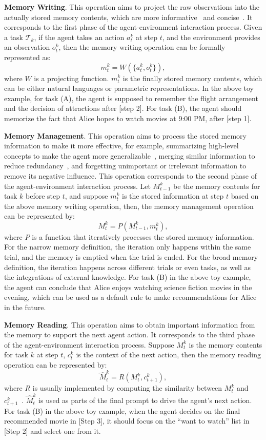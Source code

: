 \documentclass{article}
\theoremstyle{definition}
\theoremstyle{theorem}
\theoremstyle{proof}
\theoremstyle{remark}
\begin{document}
	\textbf{Memory Writing}. 
	This operation aims to project the raw observations into the actually stored memory contents, which are more informative~\cite{ret_llm} and concise~\cite{memorybank}.
	It corresponds to the first phase of the agent-environment interaction process.
	Given a task $\mathcal{T}_k$, if the agent takes an action $a^k_t$ at step $t$, and the environment provides an observation $o^k_t$, then the memory writing operation can be formally represented as:
	$$m_{t}^k = W(\{a^k_t, o^k_t\}),$$
	where $W$ is a projecting function. 
	$m_t^k$ is the finally stored memory contents, which can be either natural languages or parametric representations.    
	In the above toy example, for task (A), the agent is supposed to remember the flight arrangement and the decision of attractions after [step 2].
	For task (B), the agent should memorize the fact that Alice hopes to watch movies at 9:00 PM, after [step 1].
	
	\textbf{Memory Management}. 
	This operation aims to process the stored memory information to make it more effective, for example, summarizing high-level concepts to make the agent more generalizable~\cite{memorybank}, merging similar information to reduce redundancy~\cite{ret_llm}, and forgetting unimportant or irrelevant information to remove its negative influence.
	This operation corresponds to the second phase of the agent-environment interaction process.
	Let $M_{t-1}^k$ be the memory contents for task $k$ before step $t$, and suppose $m_{t}^k$ is the stored information at step $t$ based on the above memory writing operation, then, the memory management operation can be represented by:
	$$M_{t}^k = P(M_{t-1}^k, m_{t}^k),$$
	where $P$ is a function that iteratively processes the stored memory information.
	For the narrow memory definition, the iteration only happens within the same trial, and the memory is emptied when the trial is ended. For the broad memory definition, the iteration happens across different trials or even tasks, as well as the integrations of external knowledge.
	{For task (B) in the above toy example, the agent can conclude that Alice enjoys watching science fiction movies in the evening, which can be used as a default rule to make recommendations for Alice in the future.}
	
	\textbf{Memory Reading}. 
	This operation aims to obtain important information from the memory to support the next agent action.
	It corresponds to the third phase of the agent-environment interaction process.
	Suppose $M_{t}^k$ is the memory contents for task $k$ at step $t$, $c_{t}^k$ is the context of the next action, then the memory reading operation can be represented by:
	$$\hat{M}_{t}^k = R(M_{t}^k, c_{t+1}^k),$$
	where $R$ is usually implemented by computing the similarity between $M_{t}^k$ and $c_{t+1}^k$~\cite{expel}. $\hat{M}_{t}^k$ is used as parts of the final prompt to drive the agent's next action.
	{For task (B) in the above toy example, when the agent decides on the final recommended movie in [Step 3], it should focus on the ``want to watch'' list in [Step 2] and select one from it.}
	
\end{document}
